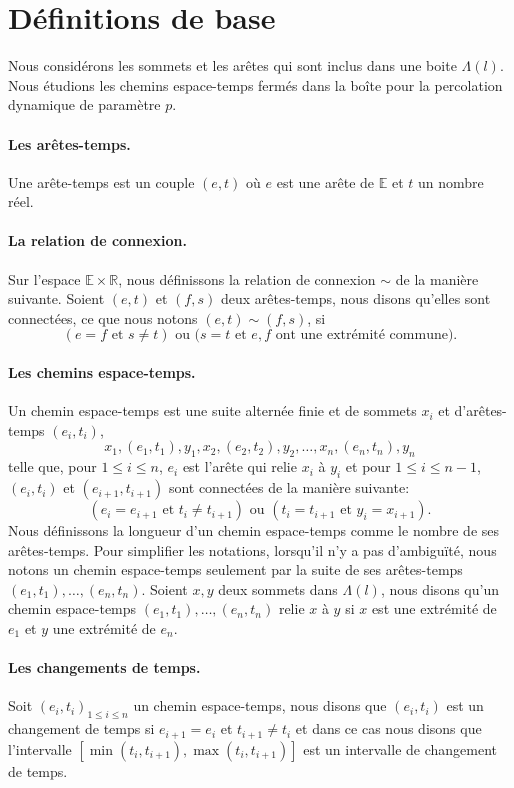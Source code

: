 \documentclass[titlepage,a4paper,12pt]{article}
\newcounter{d}
\newcounter{t}
\newcounter{p}
\newcounter{c}
\newcounter{a}
\newcounter{l}
\begin{document}
\section{Définitions de base}
Nous considérons les sommets et les arêtes qui sont inclus dans une boite $\Lambda(l)$. Nous étudions les chemins espace-temps fermés dans la boîte pour la percolation dynamique de paramètre $p$.
\paragraph{Les arêtes-temps.}
Une arête-temps est un couple $(e,t)$ où $e$ est une arête de $\mathbb{E}$ et $t$ un nombre réel. 

\paragraph{La relation de connexion.} Sur l'espace $\mathbb{E}\times \mathbb{R}$, nous définissons la relation de connexion $\sim$ de la manière suivante. Soient $(e,t)$ et $(f,s)$ deux arêtes-temps, nous disons qu'elles sont connectées, ce que nous notons $(e,t)\sim(f,s)$, si $$(e=f \text{ et } s\neq t)\text{ ou (}s=t\text{ et }e,f\text{ ont une extrémité commune)}.$$
\paragraph{Les chemins espace-temps.} Un chemin espace-temps est une suite alternée finie et de sommets $x_i$ et d'arêtes-temps $(e_i,t_i)$, $$x_1,(e_1,t_1),y_1,x_2,(e_2,t_2),y_2,\dots,x_{n},(e_n,t_n),y_n$$ telle que, pour $1\leqslant i \leqslant n$, $e_i$ est l'arête qui relie $x_i$ à $y_i$ et pour $ 1\leqslant i \leqslant n-1$, $(e_i,t_i)$ et $(e_{i+1},t_{i+1})$ sont connectées de la manière suivante:
$$ (e_i = e_{i+1}\text{ et }t_i \neq t_{i+1})\text{ ou }(t_i = t_{i+1} \text{ et } y_i = x_{i+1})
.$$ Nous définissons la longueur d'un chemin espace-temps comme le nombre de ses arêtes-temps. Pour simplifier les notations, lorsqu'il n'y a pas d’ambiguïté, nous notons un chemin espace-temps seulement par la suite de ses arêtes-temps $(e_1,t_1),\dots,(e_n,t_n)$. Soient $x,y$ deux sommets dans $\Lambda(l)$, nous disons qu'un chemin espace-temps $(e_1,t_1),\dots,(e_n,t_n)$ relie $x$ à $y$ si $x$ est une extrémité de $e_1$ et $y$ une extrémité de $e_n$.
\paragraph{Les changements de temps.} Soit $(e_i,t_i)_{1\leqslant i \leqslant n}$ un chemin espace-temps, nous disons que $(e_i,t_i)$ est un changement de temps si $e_{i+1} = e_i$ et $t_{i+1}\neq t_i$ et dans ce cas nous disons que l'intervalle $[\min(t_i,t_{i+1}),\max(t_i,t_{i+1})]$ est un intervalle de changement de temps.
\end{document}
